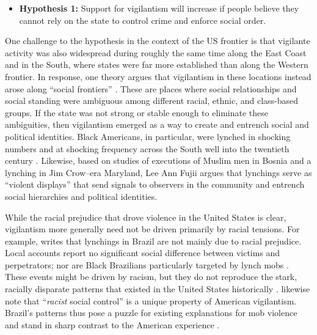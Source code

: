\documentclass[12pt,ansiapaper]{article}
\begin{document}
\begin{itemize}
  \item \textbf{Hypothesis 1:} Support for vigilantism will increase if people believe they cannot rely on the state to control crime and enforce social order.
\end{itemize}

One challenge to the hypothesis in the context of the US frontier is that vigilante activity was also widespread during roughly the same time along the East Coast and in the South, where states were far more established than along the Western frontier. In response, one theory argues that vigilantism in these locations instead arose along ``social frontiers'' \citep{obert2018keeping}. These are places where social relationships and social standing were ambiguous among different racial, ethnic, and class-based groups. If the state was not strong or stable enough to eliminate these ambiguities, then vigilantism emerged as a way to create and entrench social and political identities. Black Americans, in particular, were lynched in shocking numbers and at shocking frequency across the South well into the twentieth century \citep{dray2003hands,seguin2019national}. Likewise, based on studies of executions of Muslim men in Bosnia and a lynching in Jim Crow--era Maryland, Lee Ann Fujii \citeyearpar{fujii2017talk} argues that lynchings serve as ``violent displays'' that send signals to observers in the community and entrench social hierarchies and political identities.

While the racial prejudice that drove violence in the United States is clear, vigilantism more generally need not be driven primarily by racial tensions. For example, \citet{martins2015linchamentos} writes that lynchings in Brazil are not mainly due to racial prejudice. Local accounts report no significant social difference between victims and perpetrators; nor are Black Brazilians particularly targeted by lynch mobs \citep{band2015rocinha, pearson2018latam, sinhoretto2009linchamentos}. These events might be driven by racism, but they do not reproduce the stark, racially disparate patterns that existed in the United States historically \citep[23]{martins2015linchamentos}. \citet[8]{jung2020lynching} likewise note that ``\textit{racist} social control'' is a unique property of American vigilantism. Brazil's patterns thus pose a puzzle for existing explanations for mob violence and stand in sharp contrast to the American experience \citep{smaangs2016doing, wood2011lynching}. 
\end{document}
